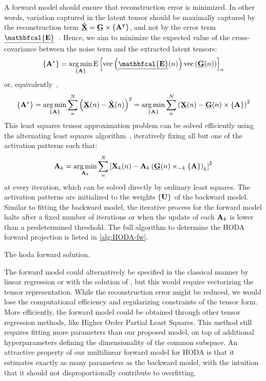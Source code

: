 A forward model should ensure that reconstruction error is minimized.
In other words, variation captured in the latent tensor should be maximally captured by the
reconstruction term $\hat{\ten{X}}= \ten{G}\mmpr{\mat{A}^\intercal}$, and not by the error term
$\ten{\mathbfcal{E}}$~\cite{Haufe2014}.
Hence, we aim to minimize the expected value of the cross-covariance between
the noise term and the extracted latent tensors:
\begin{equation}
	\left\{\mat{A}^*\right\}
  = \argmin_{\{\mat{A}\}}\text{E}\left[
      \text{vec}\left(\ten{\mathbfcal{E}}(n)\right)\text{vec}\left(\ten{G}(n)\right)
    \right]_n
\end{equation}
or, equivalently~\cite{Parra2005,Haufe2014},
\begin{equation}
	\left\{\mat{A}^*\right\}
  = \argmin_{\{\mat{A}\}}\sum_n^N\left(\ten{X}(n) - \hat{\ten{X}}(n)\right)^2
  = \argmin_{\{\mat{A}\}}\sum_n^N\left(\ten{X}(n) - \ten{G}(n)\mmpr{\mat{A}}\right)^2
\end{equation}
This least squares tensor approximation problem can be solved efficiently using the
alternating least squares algorithm~\cite{Bentbib2022}, iteratively fixing all but one of the activation patterns such that:
\begin{equation}
	\mat{A}_k = \argmin_{\mat{A}_k}
	\sum_n^N\left[\mat{X}_k(n) -
		\mat{A}_k\left(\ten{G}(n)\mmprs{\mat{A}}{k}\right)_k\right]^2
\end{equation}
at every iteration, which can be solved directly by ordinary least squares.
The activation patterns are initialized to the weights $\{\mat{U}\}$ of the
backward model.
Similar to fitting the backward model, the iterative process for the forward
model halts after a fixed number of iterations or when the update of each
$\mat{A}_k$ is lower than a predetermined threshold.
The full algorithm to determine the HODA forward projection is listed
in \cref{alg:HODA-fw}.
\begin{algorithm}
  \caption[A \acs{hoda} forward solution.]{The \acs{hoda} forward solution.}
	\label{alg:HODA-fw}
	
\end{algorithm}

The forward model could alternatively be specified in the classical manner by linear
regression or with the solution of \textcite{Haufe2014}, but this would require
vectorizing the tensor representation.
While the reconstruction error might be reduced, we would lose the computational
efficiency and regularizing constraints of the tensor form.
More efficiently, the forward model could be obtained through other tensor
regression methods, like Higher Order Partial
Least Squares.
This method still requires fitting more parameters than our
proposed model, on top of additional hyperparameters defining the
dimensionality of the common subspace.
An attractive property of our multilinear forward model for HODA is that it
estimates exactly as many parameters as the backward model, with the intuition that
it should not disproportionally contribute to overfitting.

